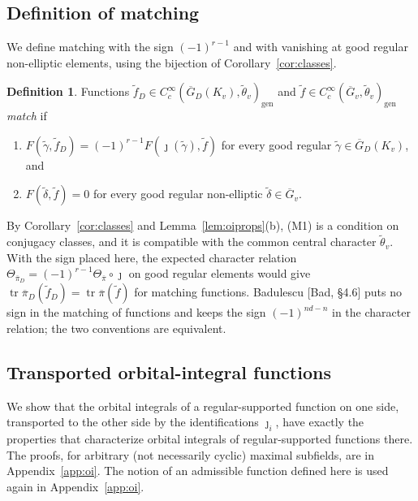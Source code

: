 \documentclass[12pt]{article}
\newcommand{\ov}[1]{\overline{#1}}
\newcommand{\gen}{\mathrm{gen}}
\newcommand{\tr}{\operatorname{tr}}
\newcommand{\Gb}{\ov{G}}
\newcommand{\GDb}{\ov{G}_D}
\newcommand{\pib}{\ov{\pi}}
\newcommand{\jj}{\jmath}
\theoremstyle{plain}
\theoremstyle{definition}
\newtheorem{definition}[theorem]{Definition}
\begin{document}
\subsection{Definition of matching}\label{subsec:defmatch}
We define matching with the sign $(-1)^{r-1}$ and with vanishing at good regular non-elliptic elements, using the bijection of Corollary~\ref{cor:classes}.

\begin{definition}\label{def:matching}
Functions $\tilde f_D\in C_c^\infty(\GDb(K_v),\tilde\theta_v)_\gen$ and $\tilde f\in C_c^\infty(\Gb_v,\tilde\theta_v)_\gen$ \emph{match} if
\begin{enumerate}[label=(M\arabic*)]
\item $F(\tilde\gamma,\tilde f_D)=(-1)^{r-1}F(\jj(\tilde\gamma),\tilde f)$ for every good regular $\tilde\gamma\in\GDb(K_v)$, and
\item $F(\tilde\delta,\tilde f)=0$ for every good regular non-elliptic $\tilde\delta\in\Gb_v$.
\end{enumerate}
\end{definition}

By Corollary~\ref{cor:classes} and Lemma~\ref{lem:oiprops}(b), (M1) is a condition on conjugacy classes, and it is compatible with the common central character $\tilde\theta_v$. With the sign placed here, the expected character relation $\Theta_{\pib_D}=(-1)^{r-1}\Theta_{\pib}\circ\jj$ on good regular elements would give $\tr\pib_D(\tilde f_D)=\tr\pib(\tilde f)$ for matching functions. Badulescu [Bad, \S4.6] puts no sign in the matching of functions and keeps the sign $(-1)^{nd-n}$ in the character relation; the two conventions are equivalent.

\subsection{Transported orbital-integral functions}\label{subsec:transported}
We show that the orbital integrals of a regular-supported function on one side, transported to the other side by the identifications $\jj_i$, have exactly the properties that characterize orbital integrals of regular-supported functions there. The proofs, for arbitrary (not necessarily cyclic) maximal subfields, are in Appendix~\ref{app:oi}. The notion of an admissible function defined here is used again in Appendix~\ref{app:oi}.
\end{document}
